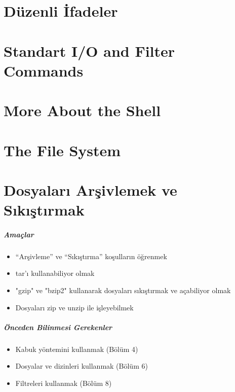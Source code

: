 \documentclass[10pt,a5paper]{book}
\begin{document}
\chapter{Düzenli İfadeler}
\chapter{Standart I/O and Filter Commands}
\chapter{More About the Shell}
\chapter{The File System}
\chapter{Dosyaları Arşivlemek ve Sıkıştırmak}
\paragraph{Amaçlar}
\begin{itemize}
 \item “Arşivleme” ve “Sıkıştırma” koşulların öğrenmek
 \item tar'ı kullanabiliyor olmak
 \item "gzip" ve "bzip2" kullanarak dosyaları sıkıştırmak ve açabiliyor olmak
 \item Dosyaları zip ve unzip ile işleyebilmek
 \end{itemize}
\paragraph{Önceden Bilinmesi Gerekenler}
\begin{itemize}
 \item Kabuk yöntemini kullanmak (Bölüm 4)
 \item Dosyalar ve dizinleri kullanmak (Bölüm 6)
 \item Filtreleri kullanmak (Bölüm 8)
 \end{itemize}
\end{document}
